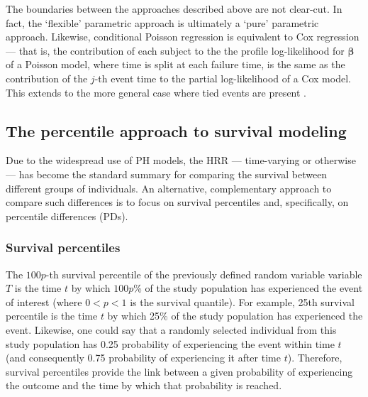 The boundaries between the approaches described above are not clear-cut. In fact, the `flexible' parametric approach is ultimately a `pure' parametric approach. Likewise, conditional Poisson regression is equivalent to Cox regression --- that is, the contribution of each subject to the the profile log-likelihood for $\boldsymbol{\beta}$ of a Poisson model, where time is split at each failure time, is the same as the contribution of the $j$-th event time to the partial log-likelihood of a Cox model. This extends to the more general case where tied events are present \citep{carstensen_demography_2005, royston_flexible_2011}. 


\subsection{The percentile approach to survival modeling}

Due to the widespread use of PH models, the HRR --- time-varying or otherwise --- has become the standard summary for comparing the survival between different groups of individuals. An alternative, complementary approach to compare such differences is to focus on survival percentiles and, specifically, on percentile differences (PDs).

\subsubsection{Survival percentiles}
The $100p$-th survival percentile of the previously defined random variable variable $T$ is the time $t$ by which $100p$\% of the study population has experienced the event of interest (where $0<p<1$ is the survival quantile). For example, 25th survival percentile is the time $t$ by which 25\% of the study population has experienced the event. Likewise, one could say that a randomly selected individual from this study population has 0.25 probability of experiencing the event within time $t$ (and consequently 0.75  probability of experiencing it after time $t$). Therefore, survival percentiles provide the link between a given probability of experiencing the outcome and the time by which that probability is reached.

